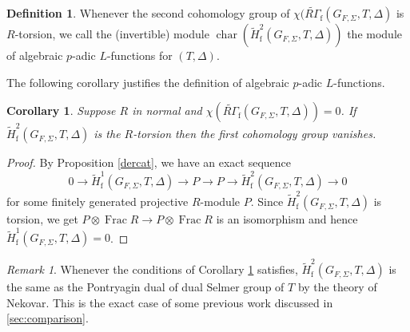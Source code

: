 \documentclass[10pt]{amsart}
\numberwithin{equation}{section}
\newtheorem{cor}[thm]{Corollary}
\theoremstyle{definition}
\newtheorem{defn}[thm]{Definition}
\theoremstyle{remark} %
\newtheorem{rmk}[thm]{Remark}
\DeclareMathOperator{\Char}{char}
\newcommand{\pan}{\mathrm{Pan}}
\DeclareMathOperator{\tr}{{tr}^*}
\renewcommand{\b}{\mathrm{bal}}
\newcommand{\f}{\mathbf{f}}
\newcommand{\g}{\mathbf{g}}
\newcommand{\T}{\mathbf{T}}
\begin{document}
	\begin{defn}
		Whenever the second cohomology group of $ \chi(\widetilde{R\Gamma}_{\mathrm{f}}(G_{F,\Sigma},T, \Delta)$ is $ R $-torsion, we call the (invertible) module $ \Char(\widetilde{H}^2_{\mathrm{f}}(G_{F,\Sigma},T, \Delta)) $ the module of algebraic $ p $-adic $ L $-functions for $ (T,\Delta) $.
	\end{defn}
	The following corollary justifies the definition of algebraic $ p $-adic $ L $-functions.
	\begin{cor}
		\label{cor : sep10}
		Suppose $ R $ in normal and $ \chi(\widetilde{R\Gamma}_{\mathrm{f}}(G_{F,\Sigma},T, \Delta)) = 0 $. If $ \widetilde{H}^2_{\mathrm{f}}(G_{F,\Sigma},T, \Delta) $ is the $ R $-torsion then the first cohomology group vanishes.
	\end{cor}
	\begin{proof}
		By Proposition \ref{dercat}, we have an exact sequence
		$$0 \rightarrow \widetilde{H}^1_{\mathrm{f}}(G_{F,\Sigma},T, \Delta) \rightarrow P \rightarrow P \rightarrow \widetilde{H}^2_{\mathrm{f}}(G_{F,\Sigma},T, \Delta) \rightarrow 0 $$
		for some finitely generated projective $ R $-module $ P $. Since $ \widetilde{H}^2_{\mathrm{f}}(G_{F,\Sigma},T, \Delta) $ is torsion, we get $ P \otimes \operatorname{Frac}R \rightarrow P \otimes \operatorname{Frac}R $ is an isomorphism and hence $ \widetilde{H}^1_{\mathrm{f}}(G_{F,\Sigma},T, \Delta) = 0 $. %
	\end{proof}
	\begin{rmk}
		Whenever the conditions of Corollary \ref{cor : sep10} satisfies, $ \widetilde{H}^2_{\mathrm{f}}(G_{F,\Sigma}, T, \Delta) $ is the same as the Pontryagin dual of dual Selmer group of $ T $ by the theory of Nekovar. This is the exact case of some previous work discussed in \textsection \ref{sec:comparison}.
	\end{rmk}
	
\end{document}
